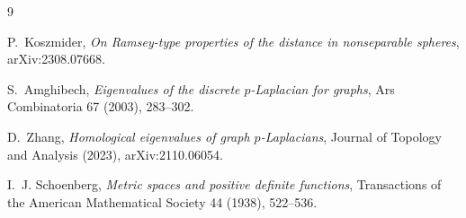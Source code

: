 \documentclass[11pt]{article}
\begin{document}
\begin{thebibliography}{9}

P.~Koszmider,
\emph{On Ramsey-type properties of the distance in nonseparable spheres},
arXiv:2308.07668.

S.~Amghibech,
\emph{Eigenvalues of the discrete \(p\)-Laplacian for graphs},
Ars Combinatoria 67 (2003), 283--302.

D.~Zhang,
\emph{Homological eigenvalues of graph \(p\)-Laplacians},
Journal of Topology and Analysis (2023), arXiv:2110.06054.

I.~J. Schoenberg,
\emph{Metric spaces and positive definite functions},
Transactions of the American Mathematical Society 44 (1938), 522--536.

\end{thebibliography}
\end{document}
